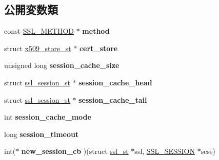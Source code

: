 \subsection*{公開変数類}
\begin{DoxyCompactItemize}
\item 
\hypertarget{structssl__ctx__st_a9e4773d3ec5b1a80abab92390015c576}{}const \hyperlink{structssl__method__st}{S\+S\+L\+\_\+\+M\+E\+T\+H\+O\+D} $\ast$ {\bfseries method}\label{structssl__ctx__st_a9e4773d3ec5b1a80abab92390015c576}

\item 
\hypertarget{structssl__ctx__st_a8b6658b3bc3acb20908f2541056e3949}{}struct \hyperlink{structx509__store__st}{x509\+\_\+store\+\_\+st} $\ast$ {\bfseries cert\+\_\+store}\label{structssl__ctx__st_a8b6658b3bc3acb20908f2541056e3949}

\item 
\hypertarget{structssl__ctx__st_af715c6f8caa8c192423ad5abfa211e6e}{}unsigned long {\bfseries session\+\_\+cache\+\_\+size}\label{structssl__ctx__st_af715c6f8caa8c192423ad5abfa211e6e}

\item 
\hypertarget{structssl__ctx__st_a3683adb75792a407eee86f042a7c7c68}{}struct \hyperlink{structssl__session__st}{ssl\+\_\+session\+\_\+st} $\ast$ {\bfseries session\+\_\+cache\+\_\+head}\label{structssl__ctx__st_a3683adb75792a407eee86f042a7c7c68}

\item 
\hypertarget{structssl__ctx__st_a1524f4319d24d011a575b8e9a70a0065}{}struct \hyperlink{structssl__session__st}{ssl\+\_\+session\+\_\+st} $\ast$ {\bfseries session\+\_\+cache\+\_\+tail}\label{structssl__ctx__st_a1524f4319d24d011a575b8e9a70a0065}

\item 
\hypertarget{structssl__ctx__st_a957af083f0d87b4347e29788bd7e00e5}{}int {\bfseries session\+\_\+cache\+\_\+mode}\label{structssl__ctx__st_a957af083f0d87b4347e29788bd7e00e5}

\item 
\hypertarget{structssl__ctx__st_a7b165f0e9fbde0499dedb660cdf0d756}{}long {\bfseries session\+\_\+timeout}\label{structssl__ctx__st_a7b165f0e9fbde0499dedb660cdf0d756}

\item 
\hypertarget{structssl__ctx__st_a114da734a32555bec7ac1543e7fcef11}{}int($\ast$ {\bfseries new\+\_\+session\+\_\+cb} )(struct \hyperlink{structssl__st}{ssl\+\_\+st} $\ast$ssl, \hyperlink{structssl__session__st}{S\+S\+L\+\_\+\+S\+E\+S\+S\+I\+O\+N} $\ast$sess)\label{structssl__ctx__st_a114da734a32555bec7ac1543e7fcef11}


\end{DoxyCompactItemize}
